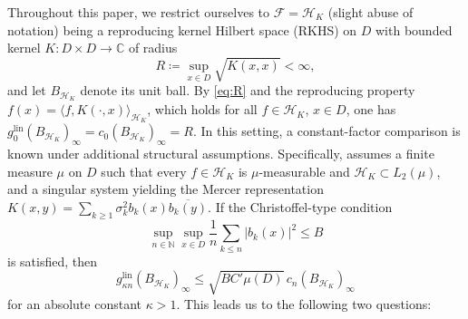 \documentclass[11pt,reqno, a4paper]{article}
\numberwithin{equation}{section}
\newcommand{\N}{\mathbb{N}}
\newcommand{\lin}{\ensuremath{\mathrm{lin}}}
\newcommand{\ip}[2]{\langle #1,#2\rangle}
\begin{document}
Throughout this paper, we restrict ourselves to $\mathcal F = \mathcal H_K$ (slight abuse of notation) being a reproducing kernel Hilbert space (RKHS) on $D$ with bounded kernel $K\colon D\times D\rightarrow\mathbb{C}$ of radius
\begin{equation}\label{eq:R}
R\coloneqq\sup_{x\in D}\sqrt{K(x,x)}<\infty ,
\end{equation}
and let $B_{\mathcal H_K}$ denote its unit ball.
By \eqref{eq:R} and the reproducing property $f(x)=\ip{f}{K(\cdot,x)}_{\mathcal H_K}$, which holds for all $f\in \mathcal H_K$, $x\in D$, one has $g_0^{\lin}(B_{\mathcal H_K})_\infty=c_0(B_{\mathcal H_K})_\infty=R$.
In this setting, a constant-factor comparison is known under additional structural assumptions.
Specifically, \cite[Thm.~11]{KPUU23} assumes a finite measure $\mu$ on $D$ such that every $f\in\mathcal H_K$ is $\mu$-measurable and $\mathcal H_K\subset L_2(\mu)$, and a singular system yielding the Mercer representation $K(x,y)=\sum_{k\ge1}\sigma_k^2b_k(x)\overline{b_k(y)}$.
If the Christoffel-type condition
\begin{equation}\label{eq:cond8}
\sup_{n\in\N}\sup_{x\in D}
\frac1n\sum_{k\le n}|b_k(x)|^2\le B
\end{equation}
is satisfied, then
\begin{equation}\label{eq:thm11}
g_{\kappa n}^{\lin}(B_{\mathcal H_K})_\infty
\le \sqrt{BC'\mu(D)}\,
c_n(B_{\mathcal H_K})_\infty
\end{equation}
for an absolute constant $\kappa>1$.
This leads us to the following two questions:
\end{document}
